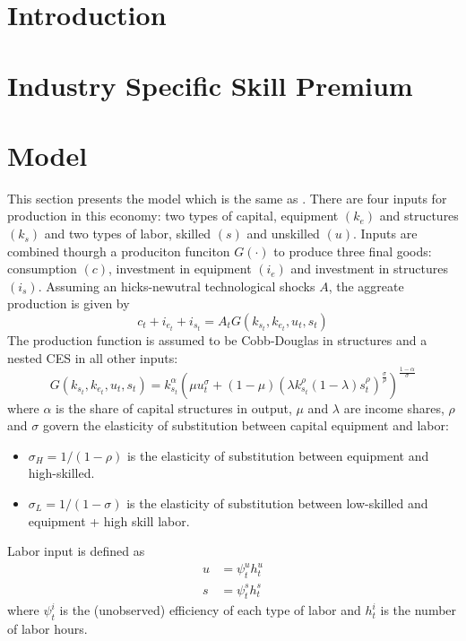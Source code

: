 \documentclass[12pt]{article}
\begin{document}
\section{Introduction}\label{sec:introduction}

\section{Industry Specific Skill Premium}

\section{Model}\label{sec:model}
This section presents the model which is the same as \citep{krusell2000capital}. There are four inputs for production in this economy: two types of capital, equipment $(k_e)$ and structures $(k_s)$ and two types of labor, skilled $(s)$ and unskilled $(u)$. Inputs are combined thourgh a produciton funciton $G(\cdot)$ to produce three final goods: consumption $(c)$, investment in equipment $(i_e)$ and investment in structures $(i_s)$. Assuming an hicks-newutral technological shocks $A$, the aggreate production is given by
\begin{equation}\label{eq:production}
  c_t + i_{e_t} + i_{s_t} = A_t G(k_{s_t}, k_{e_t}, u_t, s_t)
\end{equation}
The production function is assumed to be Cobb-Douglas in structures and a nested CES in all other inputs:
\begin{equation}\label{eq:production_fun}
  G(k_{s_t}, k_{e_t}, u_t, s_t) = k_{s_t}^\alpha\left( \mu u_t^\sigma + (1-\mu)\left(\lambda k_{s_t}^\rho (1-\lambda)s_t^\rho\right)^\frac{\sigma}{\rho}\right)^\frac{1-\alpha}{\sigma}
\end{equation}
where $\alpha$ is the share of capital structures in output, $\mu$  and $\lambda$  are income shares, $\rho$ and $\sigma$ govern the elasticity of substitution between capital equipment and labor:
\begin{itemize}
  \item $\sigma_{H} = 1/(1-\rho)$ is the elasticity of substitution between equipment and high-skilled.
  \item $\sigma_{L} = 1/(1-\sigma)$ is the elasticity of substitution between low-skilled and equipment + high skill labor.
\end{itemize}
Labor input is defined as 
\begin{align*}
  u &= \psi^u_t h^u_t\\
  s &= \psi^s_t h^s_t
\end{align*}
where $\psi^i_t$ is the (unobserved) efficiency of each type of labor and $h^i_t$ is the number of labor hours. 
\end{document}
